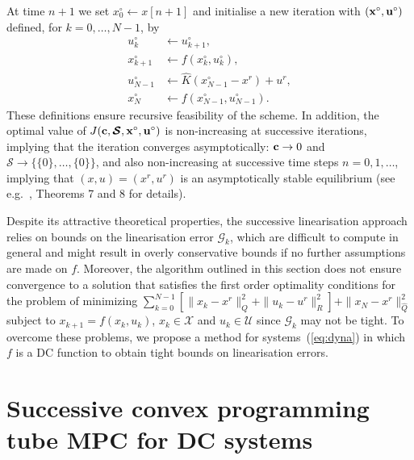 \documentclass[a4paper, 10 pt, conference]{IEEEconf}
\def\G{\mathcal{G}}
\def\U{\mathcal{U}}
\def\X{\mathcal{X}}
\def\bc{{\bf c}}
\def\bS{\boldsymbol{\mathcal{S}}}
\begin{document}
At time $n+1$ we set $x^\circ_0 \gets  x[n+1]$ and initialise a new iteration with $({\bf x}^\circ,{\bf u}^\circ)$ defined, for $k=0,\ldots,N-1$, by
\begin{subequations}\label{eq:step_update3}
\begin{align}
u^\circ_{k} &\gets u^\circ_{k+1}, 
\\
\label{eq:step_update4}
x^\circ_{k+1} &\gets  f(x^\circ_{k}, u^\circ_{k}), 
\\
\label{eq:step_update5_}
 u^\circ_{N-1} &\gets \hat{K}(x^\circ_{N-1} - x^r) + u^r,
\\
\label{eq:step_update5}
x^\circ_{N} &\gets  f(x^\circ_{N-1}, u^\circ_{N-1}).
\end{align}
\end{subequations}
These definitions ensure recursive feasibility of the scheme. In addition, the optimal value of $J(\bc,\bS,{\bf x}^\circ,{\bf u}^\circ)$ is non-increasing at successive iterations, implying that the iteration converges asymptotically: $\bc \to 0$ and $\bS\to\{\{0\},\ldots,\{0\}\}$, and also non-increasing at successive time steps $n=0,1,\ldots$, implying that $(x,u)= (x^r,u^r)$ is an asymptotically stable equilibrium (see e.g.~\cite{mark}, Theorems 7 and 8 for details).


Despite its attractive theoretical properties, the successive linearisation approach relies on bounds on the linearisation error $\G_k$, which are difficult to compute in general and might result in overly conservative bounds if no further assumptions are made on $f$. Moreover, the algorithm outlined in this section does not ensure convergence to a solution that satisfies the first order optimality conditions for the problem of minimizing $\sum_{k=0}^{N-1} [\|x_k-x^r\|_Q^2 + \|u_k-u^r\|_R^2] + \|x_N-x^r\|_{\hat{Q}}^2$ subject to $x_{k+1}=f(x_k,u_k)$, $x_k\in\X$ and $u_k\in\U$ since $\G_k$ may not be tight.
To overcome these problems, we propose a method for systems~(\ref{eq:dyna}) in which $f$ is a DC function to obtain tight bounds on linearisation errors.


\section{Successive convex programming tube MPC for DC systems}
\label{sec:theory}
\end{document}
